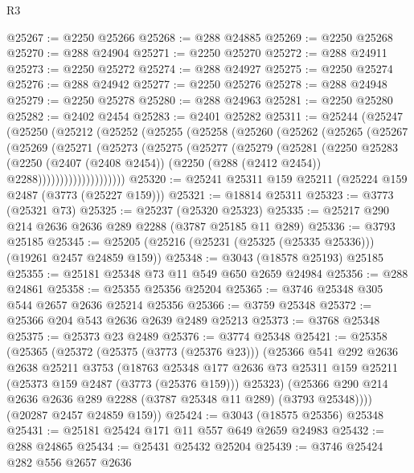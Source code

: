 \begin{lexlean}{R3}
\begin{coremodule}
@25267 := @2250 @25266
@25268 := @288 @24885
@25269 := @2250 @25268
@25270 := @288 @24904
@25271 := @2250 @25270
@25272 := @288 @24911
@25273 := @2250 @25272
@25274 := @288 @24927
@25275 := @2250 @25274
@25276 := @288 @24942
@25277 := @2250 @25276
@25278 := @288 @24948
@25279 := @2250 @25278
@25280 := @288 @24963
@25281 := @2250 @25280
@25282 := @2402 @2454
@25283 := @2401 @25282
@25311 := @25244
    (@25247
      (@25250
        (@25212
          (@25252
            (@25255
              (@25258
                (@25260
                  (@25262
                    (@25265
                      (@25267
                        (@25269
                          (@25271
                            (@25273
                              (@25275
                                (@25277
                                  (@25279
                                    (@25281
                                      (@2250
                                        @25283
                                        (@2250
                                          (@2407 (@2408 @2454))
                                          (@2250 (@288 (@2412 @2454)) @2288))))))))))))))))))))
@25320 := @25241 @25311 @159 @25211 (@25224 @159 @2487 (@3773 (@25227 @159)))
@25321 := @18814 @25311
@25323 := @3773 (@25321 @73)
@25325 := @25237 (@25320 @25323)
@25335 := @25217 @290 @214 @2636 @2636 @289 @2288 (@3787 @25185 @11 @289)
@25336 := @3793 @25185
@25345 := @25205 (@25216 (@25231 (@25325 (@25335 @25336))) (@19261 @2457 @24859 @159))
@25348 := @3043 (@18578 @25193) @25185
@25355 := @25181 @25348 @73 @11 @549 @650 @2659 @24984
@25356 := @288 @24861
@25358 := @25355 @25356 @25204
@25365 := @3746 @25348 @305 @544 @2657 @2636 @25214 @25356
@25366 := @3759 @25348
@25372 := @25366 @204 @543 @2636 @2639 @2489 @25213
@25373 := @3768 @25348
@25375 := @25373 @23 @2489
@25376 := @3774 @25348
@25421 := @25358
    (@25365
      (@25372
        (@25375 (@3773 (@25376 @23)))
        (@25366
          @541
          @292
          @2636
          @2638
          @25211
          @3753
          (@18763
            @25348
            @177
            @2636
            @73
            @25311
            @159
            @25211
            (@25373 @159 @2487 (@3773 (@25376 @159)))
            @25323)
          (@25366 @290 @214 @2636 @2636 @289 @2288 (@3787 @25348 @11 @289) (@3793 @25348))))
      (@20287 @2457 @24859 @159))
@25424 := @3043 (@18575 @25356) @25348
@25431 := @25181 @25424 @171 @11 @557 @649 @2659 @24983
@25432 := @288 @24865
@25434 := @25431 @25432 @25204
@25439 := @3746 @25424 @282 @556 @2657 @2636

\end{coremodule}
\end{lexlean}
